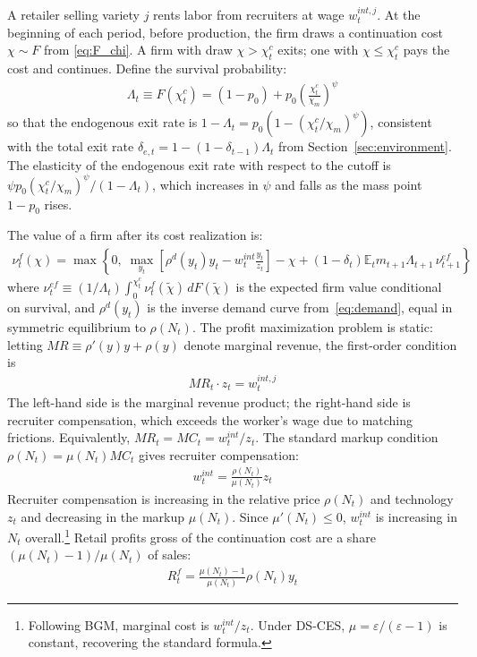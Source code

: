 \documentclass[authoryear, review, 12pt]{elsarticle}
\begin{document}
	A retailer selling variety $j$ rents labor from recruiters at 
	wage $w_t^{int,j}$. At the beginning of each period, before 
	production, the firm draws a continuation cost $\chi\sim F$ from
	\eqref{eq:F_chi}. A firm with draw $\chi>\chi_t^c$ exits; one with $\chi\leq\chi_t^c$ 
	pays the cost and continues. Define the survival probability:
	\begin{align}\label{eq:Lambda}
		\Lambda_t \equiv F(\chi_t^c) = (1-p_0) 
		+ p_0\left(\frac{\chi_t^c}{\chi_m}\right)^\psi
	\end{align}
	so that the endogenous exit rate is $1-\Lambda_t = 
	p_0\left(1-(\chi_t^c/\chi_m)^\psi\right)$, consistent with the 
	total exit rate $\delta_{e,t}=1-(1-\delta_{t-1})\Lambda_t$ from 
	Section~\ref{sec:environment}. The elasticity of the endogenous 
	exit rate with respect to the cutoff is 
	$\psi p_0(\chi_t^c/\chi_m)^\psi/(1-\Lambda_t)$, which increases 
	in $\psi$ and falls as the mass point $1-p_0$ rises.
	
	The value of a firm after its cost realization is:
	\begin{align}\label{eq:firm_bellman}
		\nu_t^f(\chi) = \max\left\{0,\; 
		\max_{y_t}\left[\rho^d(y_t)y_t - 
		w_t^{int}\frac{y_t}{z_t}\right]
		-\chi + (1-\delta_t)\mathbb{E}_t m_{t+1}\Lambda_{t+1}
		\,\nu_{t+1}^{ef}\right\}
	\end{align}
	where $\nu_t^{ef}\equiv(1/\Lambda_t)\int_0^{\chi_t^c}
	\nu_t^f(\tilde{\chi})\,dF(\tilde{\chi})$ is the expected 
	firm value conditional on survival, and $\rho^d(y_t)$ is the 
	inverse demand curve from~\eqref{eq:demand}, equal in symmetric 
	equilibrium to $\rho(N_t)$. The profit maximization problem 
	is static: letting $MR\equiv\rho'(y)y+\rho(y)$ denote marginal 
	revenue, the first-order condition is
	\begin{align}\label{eq:retailer_optimality}
		MR_t\cdot z_t = w_t^{int,j}
	\end{align}
	The left-hand side is the marginal revenue product; the 
	right-hand side is recruiter compensation, which exceeds the 
	worker's wage due to matching frictions. Equivalently, 
	$MR_t = MC_t = w_t^{int}/z_t$. The standard markup condition 
	$\rho(N_t) = \mu(N_t)MC_t$ gives recruiter compensation:
	\begin{align}\label{eq:recruiter_compensation}
		w_t^{int} = \frac{\rho(N_t)}{\mu(N_t)}z_t
	\end{align}
	Recruiter compensation is increasing in the relative price 
	$\rho(N_t)$ and technology $z_t$ and decreasing in the markup 
	$\mu(N_t)$. Since $\mu'(N_t)\leq 0$, $w_t^{int}$ is 
	increasing in $N_t$ overall.\footnote{Following BGM, marginal 
		cost is $w_t^{int}/z_t$. Under DS-CES, $\mu=\varepsilon/
		(\varepsilon-1)$ is constant, recovering the standard formula.} 
	Retail profits gross of the continuation cost are a share 
	$(\mu(N_t)-1)/\mu(N_t)$ of sales:
	\begin{align}\label{eq:retail_profits}
		R_t^f = \frac{\mu(N_t)-1}{\mu(N_t)}\rho(N_t)y_t
	\end{align}
	
\end{document}
